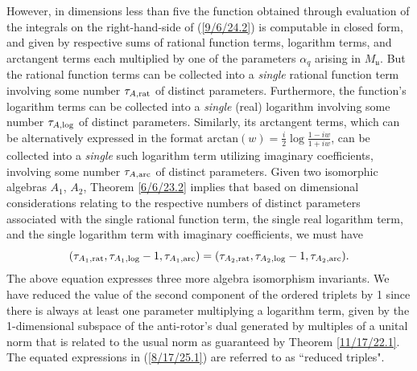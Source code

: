 \documentclass{amsart}
\theoremstyle{definition}
\numberwithin{theorem}{section}
\numberwithin{equation}{section}
\begin{document}
However, in dimensions less than five the function obtained through evaluation of the integrals on the right-hand-side of (\ref{9/6/24.2}) is computable in closed form, and given by respective sums of rational function terms, logarithm terms, and arctangent terms each multiplied by one of the parameters $\alpha_q$ arising in $M_{\mathfrak{u}}$.  But the rational function terms can be collected into a {\it single} rational function term involving some number $\tau_{A,{\rm rat}}$ of distinct parameters.  Furthermore, the function's logarithm terms can be collected into a {\it single} (real) logarithm involving some number $\tau_{A,{\rm log}}$ of distinct parameters.  Similarly, its arctangent terms, which can be alternatively expressed in the format $\text{arctan}(w) = \frac{i}{2}\log\frac{1-iw}{1+iw}$, can be collected into a {\it single} such logarithm term utilizing imaginary coefficients, involving some number $\tau_{A,{\rm arc}}$ of distinct parameters. 
Given two isomorphic algebras $A_1$, $A_2$, Theorem \ref{6/6/23.2}  implies that based on dimensional considerations relating to the respective numbers of distinct parameters associated with the single rational function term, the single real logarithm term, and the single logarithm term with imaginary coefficients, we must have \begin{equation}\label{8/17/25.1} (\tau_{A_1,{\rm rat}},\tau_{A_1,{\rm log}}-1,\tau_{A_1,{\rm arc}}) = (\tau_{A_2,{\rm rat}},\tau_{A_2,{\rm log}}-1,\tau_{A_2,{\rm arc}}).\end{equation}
The above equation expresses three more algebra isomorphism invariants.
We have reduced the value of the second component of the ordered triplets by 1 since there is always at least one parameter multiplying a logarithm term, given by the 1-dimensional subspace of the anti-rotor's dual generated by multiples of a unital norm that is related to the usual norm as guaranteed by Theorem \ref{11/17/22.1}.  The equated  expressions in (\ref{8/17/25.1}) are referred to as ``reduced triples".
      
\end{document}
